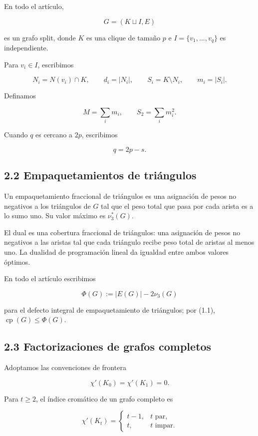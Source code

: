\documentclass[spanish,11pt,a4paper]{article}
\begin{document}
En todo el artículo,

\[
G=(K\sqcup I,E)
\]

es un grafo split, donde \(K\) es una clique de tamaño \(p\) e
\(I=\{v_1,\ldots,v_q\}\) es independiente.

Para \(v_i\in I\), escribimos

\[
N_i=N(v_i)\cap K,
\qquad
d_i=|N_i|,
\qquad
S_i=K\setminus N_i,
\qquad
m_i=|S_i|.
\]

Definamos

\[
M=\sum_i m_i,
\qquad
S_2=\sum_i m_i^2.
\]

Cuando \(q\) es cercano a \(2p\), escribimos

\[
q=2p-s.
\tag{2.1}
\]

\subsection{2.2 Empaquetamientos de
triángulos}\label{empaquetamientos-de-triuxe1ngulos}

Un empaquetamiento fraccional de triángulos es una asignación de pesos
no negativos a los triángulos de \(G\) tal que el peso total que pasa
por cada arista es a lo sumo uno. Su valor máximo es \(\nu_3^*(G)\).

El dual es una cobertura fraccional de triángulos: una asignación de
pesos no negativos a las aristas tal que cada triángulo recibe peso
total de aristas al menos uno. La dualidad de programación lineal da
igualdad entre ambos valores óptimos.

En todo el artículo escribimos

\[
\Phi(G):=|E(G)|-2\nu_3(G)
\]

para el defecto integral de empaquetamiento de triángulos; por (1.1),
\(\operatorname{cp}(G)\le\Phi(G)\).

\subsection{2.3 Factorizaciones de grafos
completos}\label{factorizaciones-de-grafos-completos}

Adoptamos las convenciones de frontera

\[
\chi'(K_0)=\chi'(K_1)=0.
\]

Para \(t\ge2\), el índice cromático de un grafo completo es

\[
\chi'(K_t)
=
\begin{cases}
t-1,&t\text{ par},\\
t,&t\text{ impar}.
\end{cases}
\tag{2.2}
\]
\end{document}
